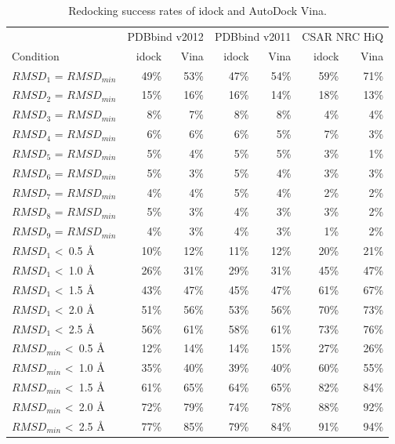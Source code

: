\begin{table}
\caption{Redocking success rates of idock and AutoDock Vina.}
\label{istar:RedockingSuccessRate}
\begin{tabular}{lrrrrrr}
\hline
& \multicolumn{2}{c}{PDBbind v2012} & \multicolumn{2}{c}{PDBbind v2011} & \multicolumn{2}{c}{CSAR NRC HiQ}\\
Condition & idock & Vina & idock & Vina & idock & Vina\\
\hline
$RMSD_1$ = $RMSD_{min}$         & 49\% & 53\% & 47\% & 54\% & 59\% & 71\%\\
$RMSD_2$ = $RMSD_{min}$         & 15\% & 16\% & 16\% & 14\% & 18\% & 13\%\\
$RMSD_3$ = $RMSD_{min}$         &  8\% &  7\% &  8\% &  8\% &  4\% &  4\%\\
$RMSD_4$ = $RMSD_{min}$         &  6\% &  6\% &  6\% &  5\% &  7\% &  3\%\\
$RMSD_5$ = $RMSD_{min}$         &  5\% &  4\% &  5\% &  5\% &  3\% &  1\%\\
$RMSD_6$ = $RMSD_{min}$         &  5\% &  3\% &  5\% &  4\% &  3\% &  3\%\\
$RMSD_7$ = $RMSD_{min}$         &  4\% &  4\% &  5\% &  4\% &  2\% &  2\%\\
$RMSD_8$ = $RMSD_{min}$         &  5\% &  3\% &  4\% &  3\% &  3\% &  2\%\\
$RMSD_9$ = $RMSD_{min}$         &  4\% &  3\% &  4\% &  3\% &  1\% &  2\%\\
\noalign{\smallskip}
$RMSD_1$     \textless\ 0.5 \AA & 10\% & 12\% & 11\% & 12\% & 20\% & 21\%\\
$RMSD_1$     \textless\ 1.0 \AA & 26\% & 31\% & 29\% & 31\% & 45\% & 47\%\\
$RMSD_1$     \textless\ 1.5 \AA & 43\% & 47\% & 45\% & 47\% & 61\% & 67\%\\
$RMSD_1$     \textless\ 2.0 \AA & 51\% & 56\% & 53\% & 56\% & 70\% & 73\%\\
$RMSD_1$     \textless\ 2.5 \AA & 56\% & 61\% & 58\% & 61\% & 73\% & 76\%\\
\noalign{\smallskip}
$RMSD_{min}$ \textless\ 0.5 \AA & 12\% & 14\% & 14\% & 15\% & 27\% & 26\%\\
$RMSD_{min}$ \textless\ 1.0 \AA & 35\% & 40\% & 39\% & 40\% & 60\% & 55\%\\
$RMSD_{min}$ \textless\ 1.5 \AA & 61\% & 65\% & 64\% & 65\% & 82\% & 84\%\\
$RMSD_{min}$ \textless\ 2.0 \AA & 72\% & 79\% & 74\% & 78\% & 88\% & 92\%\\
$RMSD_{min}$ \textless\ 2.5 \AA & 77\% & 85\% & 79\% & 84\% & 91\% & 94\%\\
\hline
\end{tabular}
\end{table}

